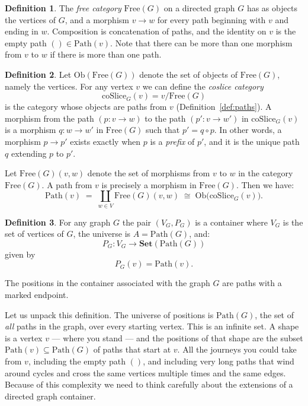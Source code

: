 \documentclass[11pt, a4paper]{article}
\theoremstyle{definition}
\newtheorem{definition}{Definition}[section]
\theoremstyle{plain}
\begin{document}
\begin{definition}
The \emph{free category} $\mathrm{Free}(G)$ on a directed graph $G$ has as objects the
vertices of $G$, and a morphism $v \to w$ for every path beginning with $v$
and ending in $w$.
Composition is concatenation of paths, and the identity on $v$ is the empty
path $() \in \mathrm{Path}(v)$.  Note that there can be more than one
morphism from $v$ to $w$ if there is more than one path.
\end{definition}

\noindent\colorbox{gray!15}{\parbox{\dimexpr\linewidth-2\fboxsep}{%
\begin{definition}
Let $\mathrm{Ob}(\mathrm{Free}(G))$ denote the set of objects of
$\mathrm{Free}(G)$, namely the vertices.  For any vertex $v$ we can define
the \emph{coslice category}
\[
  \mathrm{coSlice}_G(v) = v/\mathrm{Free}(G)
\]
is the category whose objects are paths from $v$ (Definition~\ref{def:paths}).
A morphism from the path $(p : v \to w)$ to the path $(p' : v \to w')$ in $\mathrm{coSlice}_G(v)$ is a morphism
$q : w \to w'$ in $\mathrm{Free}(G)$ such that $p' = q \circ p$.  In other
words, a morphism $p \to p'$ exists exactly when $p$ is a \emph{prefix} of
$p'$, and it is the unique path $q$ extending $p$ to $p'$.
\end{definition}%
}}

Let $\mathrm{Free}(G)(v, w)$ denote the set of morphisms from $v$ to $w$ in
the category $\mathrm{Free}(G)$.
A path from $v$ is
precisely a morphism in $\mathrm{Free}(G)$.  Then we have:
\[
  \mathrm{Path}(v) \;=\; \coprod_{w \in V} \mathrm{Free}(G)(v, w)
  \;\cong\; \mathrm{Ob}\bigl(\mathrm{coSlice}_G(v)\bigr).
\]

\noindent\colorbox{green!10}{\parbox{\dimexpr\linewidth-2\fboxsep}{%
\begin{definition}\label{def:graph-container}
For any graph $G$ the pair $(V_G, P_G)$ is a container where
$V_G$ is the set of vertices of $G$, the universe is
$A = \mathrm{Path}(G)$, and:
\[
  P_G : V_G \to \mathbf{Set}(\mathrm{Path}(G))
\]
given by
\[
  P_G(v) = \mathrm{Path}(v).
\]
\end{definition}%
}}

\begin{center}
\colorbox{blue!10}{\parbox{0.9\linewidth}{\centering
The positions in the container associated with the graph $G$ are paths with a marked endpoint.}}
\end{center}

\noindent
Let us unpack this definition.  The universe of positions is
$\mathrm{Path}(G)$, the set of \emph{all} paths in the graph, over every
starting vertex.  This is an infinite set.  A shape is a vertex $v$ --- where you stand --- and
the positions of that shape are the subset
$\mathrm{Path}(v) \subseteq \mathrm{Path}(G)$ of paths that start at
$v$.  All the journeys you could take from $v$, including the empty path
$()$, and including very long paths that wind around cycles and cross
the same vertices multiple times and the same edges.  Because of this
complexity we need to think carefully about the extensions of a
directed graph container.
\end{document}
